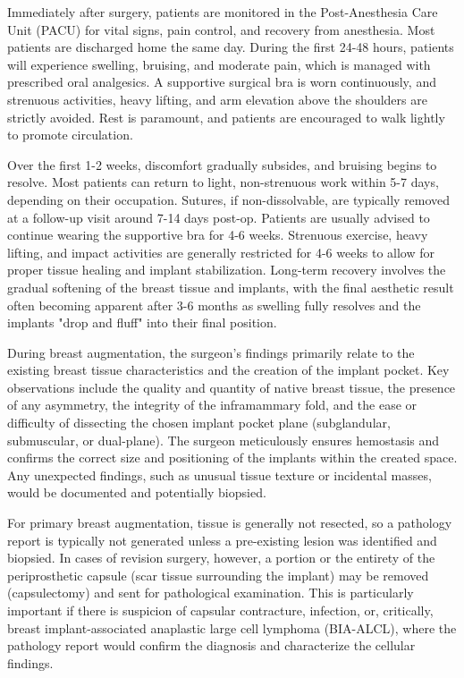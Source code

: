 Immediately after surgery, patients are monitored in the Post-Anesthesia Care Unit (PACU) for vital signs, pain control, and recovery from anesthesia. Most patients are discharged home the same day. During the first 24-48 hours, patients will experience swelling, bruising, and moderate pain, which is managed with prescribed oral analgesics. A supportive surgical bra is worn continuously, and strenuous activities, heavy lifting, and arm elevation above the shoulders are strictly avoided. Rest is paramount, and patients are encouraged to walk lightly to promote circulation.

Over the first 1-2 weeks, discomfort gradually subsides, and bruising begins to resolve. Most patients can return to light, non-strenuous work within 5-7 days, depending on their occupation. Sutures, if non-dissolvable, are typically removed at a follow-up visit around 7-14 days post-op. Patients are usually advised to continue wearing the supportive bra for 4-6 weeks. Strenuous exercise, heavy lifting, and impact activities are generally restricted for 4-6 weeks to allow for proper tissue healing and implant stabilization. Long-term recovery involves the gradual softening of the breast tissue and implants, with the final aesthetic result often becoming apparent after 3-6 months as swelling fully resolves and the implants "drop and fluff" into their final position.

During breast augmentation, the surgeon's findings primarily relate to the existing breast tissue characteristics and the creation of the implant pocket. Key observations include the quality and quantity of native breast tissue, the presence of any asymmetry, the integrity of the inframammary fold, and the ease or difficulty of dissecting the chosen implant pocket plane (subglandular, submuscular, or dual-plane). The surgeon meticulously ensures hemostasis and confirms the correct size and positioning of the implants within the created space. Any unexpected findings, such as unusual tissue texture or incidental masses, would be documented and potentially biopsied.

For primary breast augmentation, tissue is generally not resected, so a pathology report is typically not generated unless a pre-existing lesion was identified and biopsied. In cases of revision surgery, however, a portion or the entirety of the periprosthetic capsule (scar tissue surrounding the implant) may be removed (capsulectomy) and sent for pathological examination. This is particularly important if there is suspicion of capsular contracture, infection, or, critically, breast implant-associated anaplastic large cell lymphoma (BIA-ALCL), where the pathology report would confirm the diagnosis and characterize the cellular findings.


